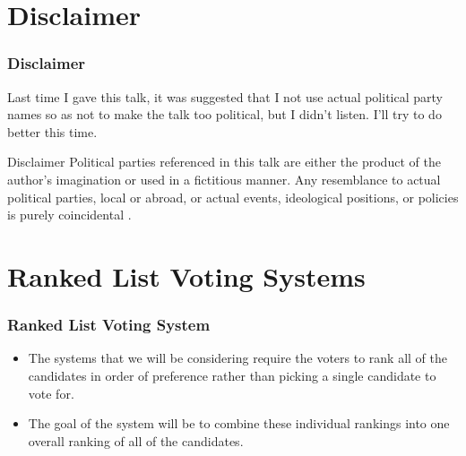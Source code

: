 \documentclass{beamer}
\begin{document}
    \section{Disclaimer}
    \begin{frame}
        \frametitle{Disclaimer}

        Last time I gave this talk, it was suggested that I not use actual political party names so as not to make the talk too political, but I didn't listen. I'll try to do better this time.
    
        \begin{block}{Disclaimer}
            Political parties referenced in this talk are either the product of the author's imagination or used in a fictitious manner. Any resemblance to actual political parties, local or abroad, or actual events, ideological positions, or policies is purely coincidental .
        \end{block}

    \end{frame}

    \section{Ranked List Voting Systems}
    \begin{frame}
        \frametitle{Ranked List Voting System}
    
        \begin{itemize}
            \item The systems that we will be considering require the voters to rank all of the candidates in order of preference rather than picking a single candidate to vote for.
            \item The goal of the system will be to combine these individual rankings into one overall ranking of all of the candidates.
        \end{itemize}
    
    \end{frame}
    
\end{document}
